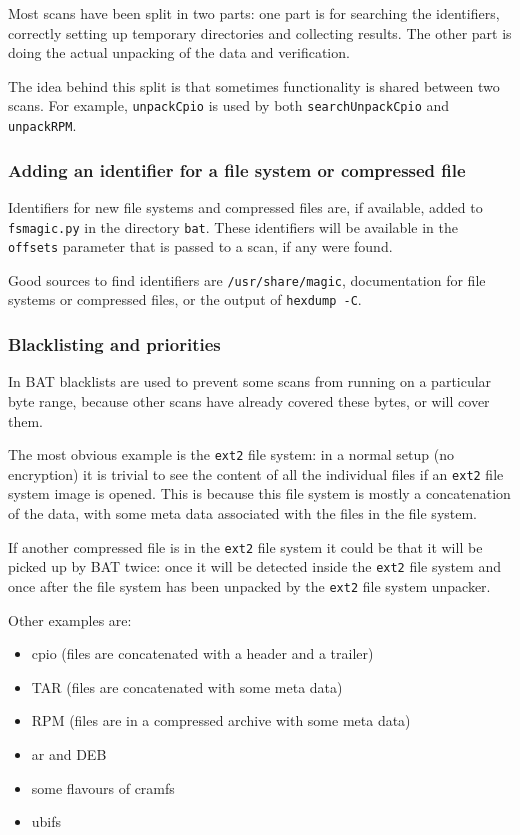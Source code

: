 \documentclass[10pt,a4paper]{article}
\begin{document}
Most scans have been split in two parts: one part is for searching the
identifiers, correctly setting up temporary directories and collecting results.
The other part is doing the actual unpacking of the data and verification.

The idea behind this split is that sometimes functionality is shared between
two scans. For example, \texttt{unpackCpio} is used by both
\texttt{searchUnpackCpio} and \texttt{unpackRPM}.

\subsubsection{Adding an identifier for a file system or compressed file}

Identifiers for new file systems and compressed files are, if available, added
to \texttt{fsmagic.py} in the directory \texttt{bat}. These identifiers will be
available in the \texttt{offsets} parameter that is passed to a scan, if any
were found.

Good sources to find identifiers are \texttt{/usr/share/magic}, documentation
for file systems or compressed files, or the output of \texttt{hexdump -C}.

\subsubsection{Blacklisting and priorities}

In BAT blacklists are used to prevent some scans from running on a particular
byte range, because other scans have already covered these bytes, or will cover
them.

The most obvious example is the \texttt{ext2} file system: in a normal setup
(no encryption) it is trivial to see the content of all the individual files
if an \texttt{ext2} file system image is opened. This is because this file
system is mostly a concatenation of the data, with some meta data associated
with the files in the file system.

If another compressed file is in the \texttt{ext2} file system it could be that
it will be picked up by BAT twice: once it will be detected inside the
\texttt{ext2} file system and once after the file system has been unpacked by
the \texttt{ext2} file system unpacker.

Other examples are:

\begin{itemize}
\item cpio (files are concatenated with a header and a trailer)
\item TAR (files are concatenated with some meta data)
\item RPM (files are in a compressed archive with some meta data)
\item ar and DEB
\item some flavours of cramfs
\item ubifs
\end{itemize}
\end{document}
